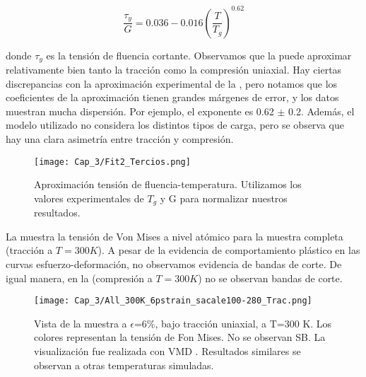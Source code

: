 \begin{equation}\label{C3:eq:johnsonSamwer}
\frac{\tau _{y}}{G} = 0.036-0.016\left( \frac{T}{T_g} \right)^{0.62}
\end{equation}

donde $\tau _{y}$ es la tensión de fluencia cortante. Observamos que la  puede aproximar relativamente bien tanto la tracción como la compresión uniaxial. Hay ciertas discrepancias con la aproximación experimental de la , pero notamos que los coeficientes de la aproximación tienen grandes márgenes de error, y los datos muestran mucha dispersión. Por ejemplo, el exponente es 0.62 $\pm$ 0.2. Además, el modelo utilizado no considera los distintos tipos de carga, pero se observa que hay una clara asimetría entre tracción y compresión.
	

\begin{figure}[htp]
\centering
\texttt{[image: Cap\_3/Fit2\_Tercios.png]}
\caption[Aproximación tensión de fluencia-temperatura]{Aproximación tensión de fluencia-temperatura. Utilizamos los valores experimentales de $T_g$ y G \citep{johnson05} para normalizar nuestros resultados.}
\label{C3:fg:fitDosTercios}
\end{figure}

La  muestra la tensión de Von Mises a nivel atómico para la muestra completa (tracción a $T=300K$). A pesar de la evidencia de comportamiento plástico en las curvas esfuerzo-deformación, no observamos evidencia de bandas de corte. De igual manera, en la  (compresión a $T=300K$) no se observan bandas de corte. 


\begin{figure}[htp]
\centering
\texttt{[image: Cap\_3/All\_300K\_6pstrain\_sacale100-280\_Trac.png]}
\caption[Vista de la muestra a $\epsilon$=6\%, bajo tracción uniaxial, a T=300 K]{Vista de la muestra a $\epsilon$=6\%, bajo tracción uniaxial, a T=300 K. Los colores representan la tensión de Fon Mises. No se observan SB. La visualización fue realizada con VMD \citep{humphrey96}. Resultados similares se observan a otras temperaturas simuladas.}
\label{C3:fg:sampleTen}
\end{figure}

